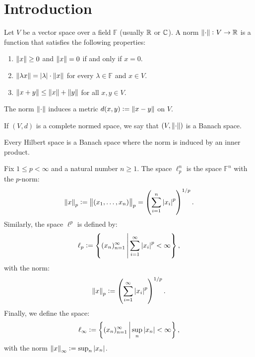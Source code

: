 \documentclass[11pt,a4paper]{article}
\begin{document}
\maketitle


\newpage
\tableofcontents
\newpage

\section{Introduction}

\begin{definition}
  Let $V$ be a vector space over a field $\mathbb F$ (usually $\mathbb{R}$ or $\mathbb{C}$).
  A norm $\left\lVert\cdot\right\rVert \colon V \to \mathbb{R}$ is a function that satisfies
  the following properties:
  \begin{enumerate}
    \item[(1)] $\left\lVert x\right\rVert \geq 0$ and $\left\lVert x\right\rVert = 0$ if and only if $x = 0$.
    \item[(2)] $\left\lVert\lambda x\right\rVert = \left\lvert\lambda\right\rvert \cdot \left\lVert x\right\rVert$
      for every $\lambda \in \mathbb F$ and $x \in V$.
    \item[(3)] $\left\lVert x + y\right\rVert \le \left\lVert x\right\rVert + \left\lVert y\right\rVert$ for all $x,y \in V$.
  \end{enumerate}
  The norm $\left\lVert\cdot\right\rVert$ induces a metric $d(x,y) := \left\lVert x - y\right\rVert$ on $V$.
\end{definition}

\begin{definition}
  If $(V,d)$ is a complete normed space,
  we say that $(V,\left\lVert\cdot\right\rVert)$ is a Banach space.
\end{definition}

\begin{example}
  Every Hilbert space is a Banach space where the norm is induced by
  an inner product.
\end{example}

\begin{example}
  Fix $1 \le p < \infty$ and a natural number $n \geq 1$.
  The space $\ell_p^n$ is the space $\mathbb F^n$ with the $p$-norm:
  \[
    \norm{x}_p :=
    \norm{(x_1,\dots,x_n)}_p =
    \del{\sum_{i=1}^{n} \abs{x_i}^p}^{1/p}.
  \]
  Similarly, the space $\ell^p$ is defined by:
  \[
    \ell_p :=
    \left\{(x_n)_{n=1}^{\infty} \,\middle\vert\, \sum_{i=1}^{\infty} \left\lvert x_i\right\rvert^p < \infty\right\},
  \]
  with the norm:
  \[
    \norm{x}_p := \del{\sum_{i=1}^{\infty} \abs{x_i}^p}^{1/p}.
  \]
  Finally, we define the space:
  \[
    \ell_{\infty} :=
    \left\{(x_n)_{n=1}^{\infty} \,\middle\vert\, \sup_{n} \left\lvert x_n\right\rvert < \infty\right\},
  \]
  with the norm $\left\lVert x\right\rVert_{\infty} := \sup_{n} \left\lvert x_n\right\rvert$.
\end{example}
\end{document}
